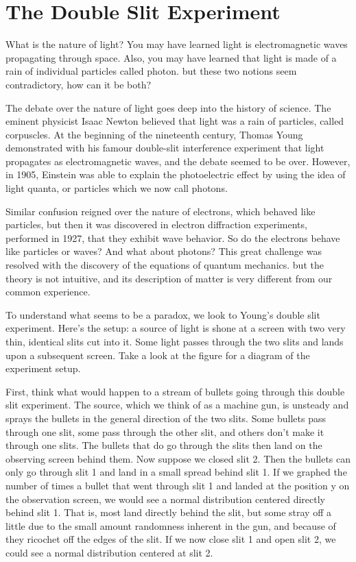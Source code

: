 \documentclass[12pt, oneside]{book}
\theoremstyle{definition}
\theoremstyle{definition}
\theoremstyle{remark}
\begin{document}
\section{The Double Slit Experiment}
What is the nature of light? You may have learned light is electromagnetic waves propagating through space. Also, you may have learned that light is made of a rain of individual particles called photon. but these two notions seem contradictory, how can it be both?

The debate over the nature of light goes deep into the history of science. The eminent physicist Isaac Newton believed that light was a rain of particles, called corpuscles. At the beginning of the nineteenth century, Thomas Young demonstrated with his famour double-slit interference experiment that light propagates as electromagnetic waves, and the debate seemed to be over. However, in 1905, Einstein was able to explain the photoelectric effect by using the idea of light quanta, or particles which we now call photons.

Similar confusion reigned over the nature of electrons, which behaved like particles, but then it was discovered in electron diffraction experiments, performed in 1927, that they exhibit wave behavior. So do the electrons behave like particles or waves? And what about photons? This great challenge was resolved with the discovery of the equations of quantum mechanics. but the theory is not intuitive, and its description of matter is very different from our common experience.

To understand what seems to be a paradox, we look to Young's double slit experiment. Here's the setup: a source of light is shone at a screen with two very thin, identical slits cut into it. Some light passes through the two slits and lands upon a subsequent screen. Take a look at the figure for a diagram of the experiment setup.

First, think what would happen to a stream of bullets going through this double slit experiment. The source, which we think of as a machine gun, is unsteady and sprays the bullets in the general direction of the two slits. Some bullets pass through one slit, some pass through the other slit, and others don't make it through one slits. The bullets that do go through the slits then land on the observing screen behind them. Now suppose we closed slit 2. Then the bullets can only go through slit 1 and land in a small spread behind slit 1. If we graphed the number of times a bullet that went through slit 1 and landed at the position y on the observation screen, we would see a normal distribution centered directly behind slit 1. That is, most land directly behind the slit, but some stray off a little due to the small amount randomness inherent in the gun, and because of they ricochet off the edges of the slit. If we now close slit 1 and open slit 2, we could see a normal distribution centered at slit 2.
\end{document}
